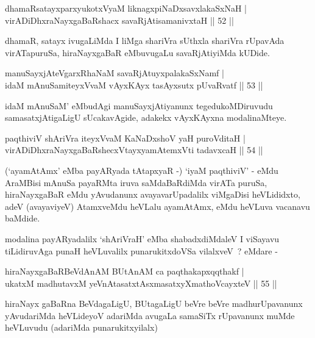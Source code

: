 \begin{shl}
dhamaRsatayxparxyukotxV\s yaM liknagxpiNaDxsavxlakaSxNaH |\\
virADiDhxraNayxgaBaRshacx savaRjAtisamanivxtaH \hfill || 52 ||
\end{shl}


\begin{artha}
dhamaR, satayx ivugaLiMda I liMga shariVra sUthxla shariVra rUpavAda virATapuruSa, hiraNayxgaBaR eMbuvugaLu savaRjAtiyiMda kUDide.
\end{artha}

\begin{shl}
manuSayxjAteVgarxRhaNaM savaRjAtuyxpalakaSxNamf |\\
idaM mAnuSamiteyxVvaM vAyxKAyx tasAyxsutx pUvaRvatf \hfill || 53 ||
\end{shl}

\begin{artha}
idaM mAnuSaM' eMbudAgi manuSayxjAtiyanunx tegedukoMDiruvudu samasatxjAtigaLigU sUcakavAgide, adakekx vAyxKAyxna modalinaMteye.
\end{artha}

\begin{shl}
paqthiviV shAriVra iteyxVvaM KaNaDxshoV yaH puroVditaH |\\
virADiDhxraNayxgaBaRshecxVtayxyamAtemxVti tadavxcaH \hfill || 54 ||
\end{shl}

\begin{artha}
(`ayamAtAmx' eMba payARyada tAtapxyaR -) `iyaM paqthiviV' - eMdu   AraMBisi mAnuSa payaRMta iruva saMdaBaRdiMda virATa puruSa,   hiraNayxgaBaR eMdu yAvudanunx avayavarUpadalilx viMgaDisi   heVLididxto, adeV (avayaviyeV) AtamxveMdu heVLalu ayamAtAmx, eMdu   heVLuva vacanavu baMdide.
\end{artha}

\begin{artha}
modalina payARyadalilx `shAriVraH' eMba shabadxdiMdaleV I viSayavu tiLidiruvAga punaH heVLuvalilx punarukitxdoVSa vilalxveV~? 
eMdare -
\end{artha}

\begin{shl}
hiraNayxgaBaRBeVdAnAM BUtAnAM ca paqthakapxqqthakf |\\
ukatxM madhutavxM yeVnAtasatxtAsxmasatxyXmathoVcayxteV \hfill || 55 ||
\end{shl}

\begin{artha}
hiraNayx gaBaRna BeVdagaLigU, BUtagaLigU beVre beVre madhurUpavanunx
yAvudariMda heVLideyoV adariMda avugaLa samaSiTx rUpavanunx muMde
heVLuvudu (adariMda punarukitxyilalx) 
\end{artha}


